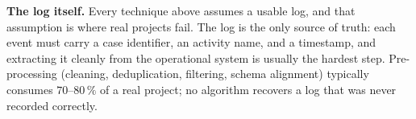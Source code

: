 \textbf{The log itself.} Every technique above assumes a usable log, and that assumption is where real projects fail. The log is the only source of truth: each event must carry a case identifier, an activity name, and a timestamp, and extracting it cleanly from the operational system is usually the hardest step. Pre-processing (cleaning, deduplication, filtering, schema alignment) typically consumes $70$--$80\,\%$ of a real project; no algorithm recovers a log that was never recorded correctly.
